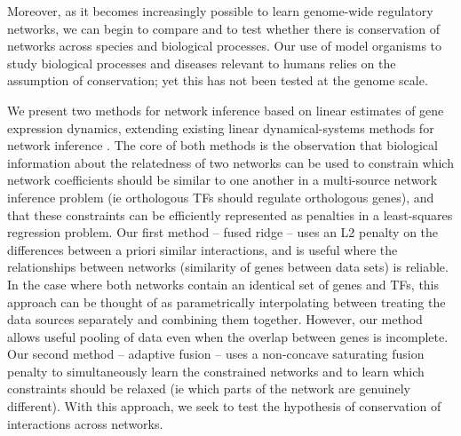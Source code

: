 \documentclass[11pt]{article}
\begin{document}
Moreover, as it becomes increasingly possible to learn genome-wide regulatory networks, we can begin to compare and to test whether there is conservation of networks across species and biological processes. Our use of model organisms to study biological processes and diseases relevant to humans relies on the assumption of conservation; yet this has not been tested at the genome scale. 

We present two methods for network inference based on linear estimates of gene expression dynamics, extending existing linear dynamical-systems methods for network inference \cite{bonneau_predictive_2007, arrieta-ortiz_experimentally_2015}. The core of both methods is the observation that biological information about the relatedness of two networks can be used to constrain which network coefficients should be similar to one another in a multi-source network inference problem (ie orthologous TFs should regulate orthologous genes), and that these constraints can be efficiently represented as penalties in a least-squares regression problem. Our first method -- fused ridge -- uses an L2 penalty on the differences between a priori similar interactions, and is useful where the relationships between networks (similarity of genes between data sets) is reliable. In the case where both networks contain an identical set of genes and TFs, this approach can be thought of as parametrically interpolating between treating the data sources separately and combining them together. However, our method allows useful pooling of data even when the overlap between genes is incomplete. Our second method -- adaptive fusion -- uses a non-concave saturating fusion penalty to simultaneously learn the constrained networks and to learn which constraints should be relaxed (ie which parts of the network are genuinely different). With this approach, we seek to test the hypothesis of conservation of interactions across networks.
\end{document}
